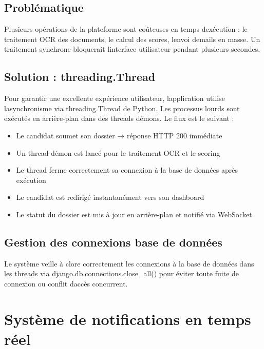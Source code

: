 \subsection{Problématique}

Plusieurs opérations de la plateforme sont coûteuses en temps
d\textquotesingle exécution : le traitement OCR des documents, le calcul
des scores, l\textquotesingle envoi d\textquotesingle emails en masse.
Un traitement synchrone bloquerait l\textquotesingle interface
utilisateur pendant plusieurs secondes.

\subsection{Solution :
threading.Thread}

Pour garantir une excellente expérience utilisateur,
l\textquotesingle application utilise l\textquotesingle asynchronisme
via threading.Thread de Python. Les processus lourds sont exécutés en
arrière-plan dans des threads démons. Le flux est le suivant :

\begin{itemize}
\item
  Le candidat soumet son dossier → réponse HTTP 200 immédiate
\item
  Un thread démon est lancé pour le traitement OCR et le scoring
\item
  Le thread ferme correctement sa connexion à la base de données après
  exécution
\item
  Le candidat est redirigé instantanément vers son dashboard
\item
  Le statut du dossier est mis à jour en arrière-plan et notifié via
  WebSocket
\end{itemize}

\subsection{Gestion des connexions base de
données}

Le système veille à clore correctement les connexions à la base de
données dans les threads via django.db.connections.close\_all() pour
éviter toute fuite de connexion ou conflit d\textquotesingle accès
concurrent.

\section{Système de notifications en temps
réel}

